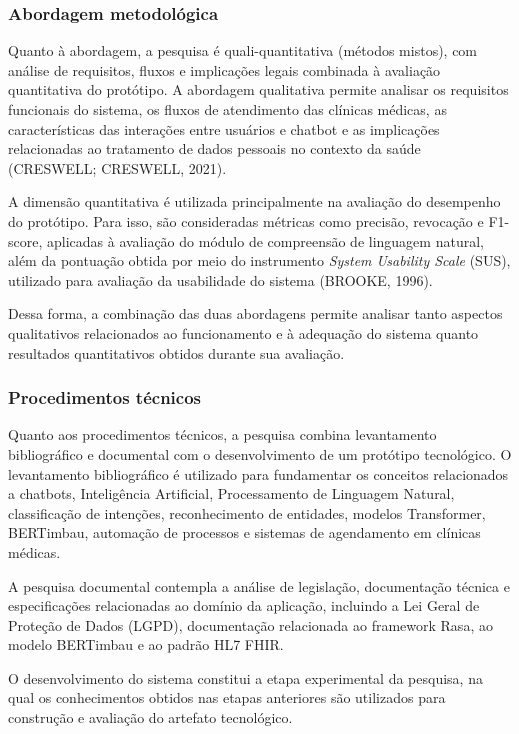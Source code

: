 \documentclass[12pt,a4paper]{extarticle}
\begin{document}
\subsubsection{Abordagem metodológica}

Quanto à abordagem, a pesquisa é quali-quantitativa (métodos mistos), com análise de requisitos, fluxos e implicações legais combinada à avaliação quantitativa do protótipo. A abordagem qualitativa permite analisar os requisitos funcionais do sistema, os fluxos de atendimento das clínicas médicas, as características das interações entre usuários e chatbot e as implicações relacionadas ao tratamento de dados pessoais no contexto da saúde (CRESWELL; CRESWELL, 2021).

A dimensão quantitativa é utilizada principalmente na avaliação do desempenho do protótipo. Para isso, são consideradas métricas como precisão, revocação e F1-score, aplicadas à avaliação do módulo de compreensão de linguagem natural, além da pontuação obtida por meio do instrumento \textit{System Usability Scale} (SUS), utilizado para avaliação da usabilidade do sistema (BROOKE, 1996).

Dessa forma, a combinação das duas abordagens permite analisar tanto aspectos qualitativos relacionados ao funcionamento e à adequação do sistema quanto resultados quantitativos obtidos durante sua avaliação.

\subsubsection{Procedimentos técnicos}

Quanto aos procedimentos técnicos, a pesquisa combina levantamento bibliográfico e documental com o desenvolvimento de um protótipo tecnológico. O levantamento bibliográfico é utilizado para fundamentar os conceitos relacionados a chatbots, Inteligência Artificial, Processamento de Linguagem Natural, classificação de intenções, reconhecimento de entidades, modelos Transformer, BERTimbau, automação de processos e sistemas de agendamento em clínicas médicas.

A pesquisa documental contempla a análise de legislação, documentação técnica e especificações relacionadas ao domínio da aplicação, incluindo a Lei Geral de Proteção de Dados (LGPD), documentação relacionada ao framework Rasa, ao modelo BERTimbau e ao padrão HL7 FHIR.

O desenvolvimento do sistema constitui a etapa experimental da pesquisa, na qual os conhecimentos obtidos nas etapas anteriores são utilizados para construção e avaliação do artefato tecnológico.
\end{document}
